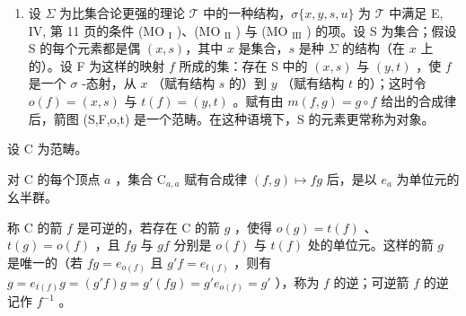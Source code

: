 \begin{enumerate}
\def\labelenumi{\arabic{enumi})}
\setcounter{enumi}{1}
\tightlist
\item
  设 \(\Sigma\) 为比集合论更强的理论 \(\mathcal{T}\) 中的一种结构，\(\sigma\{x,y,s,u\}\) 为 \(\mathcal{T}\) 中满足 E, IV, 第 11 页的条件 (MO \(_{\text{I}}\) )、(MO \(_{\text{II}}\) ) 与 (MO \(_{\text{III}}\) ) 的项。设 S 为集合；假设 S 的每个元素都是偶 \((x,s)\)，其中 \(x\) 是集合，\(s\) 是种 \(\Sigma\) 的结构（在 \(x\) 上的）。设 F 为这样的映射 \(f\) 所成的集：存在 S 中的 \((x,s)\) 与 \((y,t)\) ，使 \(f\) 是一个 \(\sigma\) -态射，从 \(x\) （赋有结构 \(s\) 的）到 \(y\) （赋有结构 \(t\) 的）；这时令 \(o(f) = (x,s)\) 与 \(t(f) = (y,t)\) 。赋有由 \(m(f,g)=g\circ f\) 给出的合成律后，箭图 (S,F,o,t) 是一个范畴。在这种语境下，S 的元素更常称为对象。
\end{enumerate}

设 C 为范畴。

对 C 的每个顶点 \(a\) ，集合 \(\mathrm{C}_{a,a}\) 赋有合成律 \((f,g)\mapsto fg\) 后，是以 \(e_a\) 为单位元的幺半群。

称 C 的箭 \(f\) 是可逆的，若存在 C 的箭 \(g\) ，使得 \(o(g) = t(f)\) 、\(t(g) = o(f)\) ，且 \(fg\) 与 \(gf\) 分别是 \(o(f)\) 与 \(t(f)\) 处的单位元。这样的箭 \(g\) 是唯一的（若 \(fg = e_{o(f)}\) 且 \(g'f = e_{t(f)}\) ，则有 \(g = e_{t(f)}g = (g'f)g = g'(fg) = g'e_{o(f)} = g'\) ），称为 \(f\) 的逆；可逆箭 \(f\) 的逆记作 \(f^{-1}\) 。


